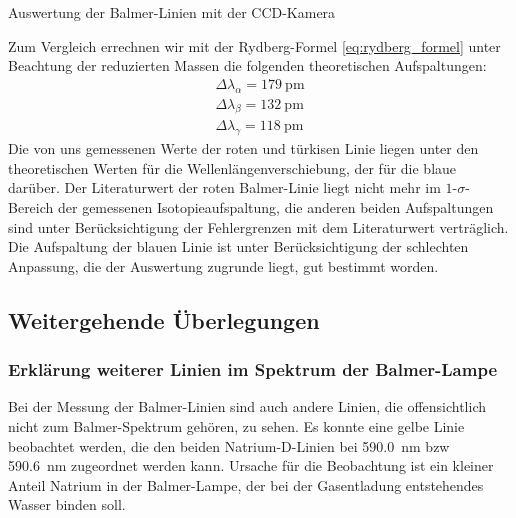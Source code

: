 \documentclass[11pt, a4paper]{article}
\numberwithin{equation}{section}
\begin{document}
\begin{table}[h]
\centering

\caption{Auswertung der Balmer-Linien mit der CCD-Kamera}
\label{tab:balmer_ccd_auswertung}
\end{table}
\noindent
Zum Vergleich errechnen wir mit der Rydberg-Formel \eqref{eq:rydberg_formel} unter Beachtung der reduzierten Massen die folgenden theoretischen Aufspaltungen:
\begin{align}
\Delta\lambda_\alpha=\SI{179}{\pico\metre}\\
\Delta\lambda_\beta=\SI{132}{\pico\metre}\\
\Delta\lambda_\gamma=\SI{118}{\pico\metre}
\end{align}
Die von uns gemessenen Werte der roten und türkisen Linie liegen unter den theoretischen Werten für die Wellenlängenverschiebung, der für die blaue darüber.
Der Literaturwert der roten Balmer-Linie liegt nicht mehr im $1$-$\sigma$-Bereich der gemessenen Isotopieaufspaltung, die anderen beiden Aufspaltungen sind unter Berücksichtigung der Fehlergrenzen mit dem Literaturwert verträglich.
Die Aufspaltung der blauen Linie ist unter Berücksichtigung der schlechten Anpassung, die der Auswertung zugrunde liegt, gut bestimmt worden.
\FloatBarrier
\subsection{Weitergehende Überlegungen}

\subsubsection{Erklärung weiterer Linien im Spektrum der Balmer-Lampe}

Bei der Messung der Balmer-Linien sind auch andere Linien, die offensichtlich nicht zum Balmer-Spektrum gehören, zu sehen. Es konnte eine gelbe Linie beobachtet werden, die den beiden Natrium-D-Linien bei \SI{590.0}{\nano\metre} bzw \SI{590.6}{\nano\metre} zugeordnet werden kann.
Ursache für die Beobachtung ist ein kleiner Anteil Natrium in der Balmer-Lampe, der bei der Gasentladung entstehendes Wasser binden soll.
\end{document}
